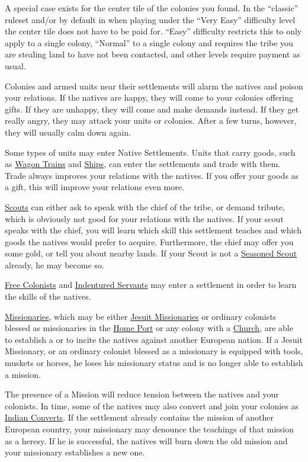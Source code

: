 \documentclass[12pt]{book}
\begin{document}
A special case exists for the center tile of the colonies you found.
In the ``classic'' ruleset and/or by default in when playing under the
``Very Easy'' difficulty level the center tile does not have to be
paid for.  ``Easy'' difficulty restricts this to only apply to a
single colony, ``Normal'' to a single colony and requires the tribe
you are stealing land to have not been contacted, and other levels
require payment as usual.

Colonies and armed units near their settlements will alarm the natives
and poison your relations. If the natives are happy, they will come to
your colonies offering gifts. If they are unhappy, they will come and
make demands instead. If they get really angry, they may attack your
units or colonies. After a few turns, however, they will usually calm
down again.

Some types of units may enter Native Settlements. Units that carry
goods, such as \hyperlink{Wagon Train}{Wagon Trains} and
\hyperlink{Naval Units}{Ships}, can enter the settlements and trade
with them. Trade always improves your relations with the natives. If
you offer your goods as a gift, this will improve your relations even
more.

\hyperlink{Scout}{Scouts} can either ask to speak with the chief of
the tribe, or demand tribute, which is obviously not good for your
relations with the natives. If your scout speaks with the chief, you
will learn which skill this settlement teaches and which goods the
natives would prefer to acquire. Furthermore, the chief may offer you
some gold, or tell you about nearby lands. If your Scout is not a
\hyperlink{Seasoned Scout}{Seasoned Scout} already, he may become so.

\hyperlink{Free Colonist}{Free Colonists} and \hyperlink{Indentured
Servant}{Indentured Servants} may enter a settlement in order to learn
the skills of the natives.

\hyperlink{Missionary}{Missionaries}, which may be either
\hyperlink{Jesuit Missionary}{Jesuit Missionaries} or ordinary
colonists blessed as missionaries in the \hyperlink{Home Port}{Home
  Port} or any colony with a \hyperlink{Church}{Church}, are able to
establish a  or to incite the natives against another
European nation. If a Jesuit Missionary, or an ordinary colonist
blessed as a missionary is equipped with tools, muskets or horses, he
loses his missionary status and is no longer able to establish a
mission.

The presence of a Mission will reduce tension between the natives and
your colonists. In time, some of the natives may also convert and join
your colonies as \hyperlink{Indian Convert}{Indian Converts}. If the
settlement already contains the mission of another European country,
your missionary may denounce the teachings of that mission as a
heresy. If he is successful, the natives will burn down the old
mission and your missionary establishes a new one.
\end{document}
